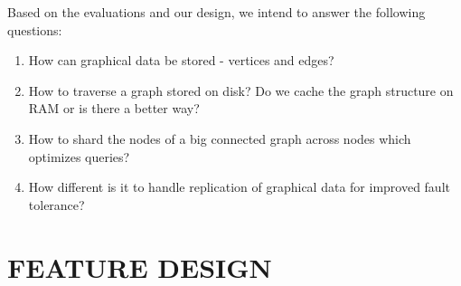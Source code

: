\documentclass[letterpaper, 11 pt, conference]{ieeeconf}  %
\begin{document}
Based on the evaluations and our design, we intend to answer the following questions:
\begin{enumerate}
	\item How can graphical data be stored - vertices and edges?
    \item How to traverse a graph stored on disk? Do we cache the graph structure on RAM or is there a better way?
	\item How to shard the nodes of a big connected graph across nodes which optimizes queries?
    \item How different is it to handle replication of graphical data for improved fault tolerance? 
\end{enumerate}

\section{FEATURE DESIGN}
\end{document}
